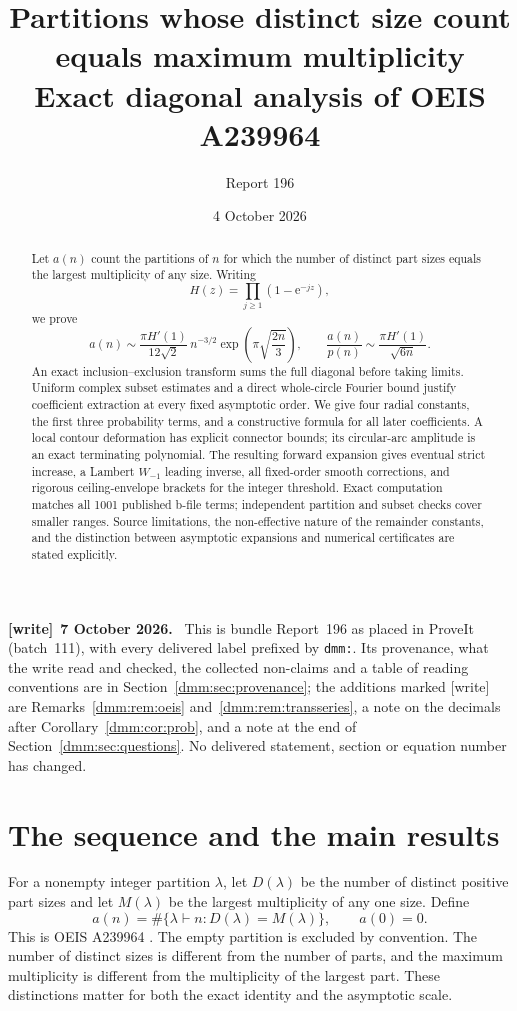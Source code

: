 \documentclass[11pt,letterpaper]{article}
\title{\LARGE\bfseries Partitions whose distinct size count\\equals maximum multiplicity\\[8pt]\large Exact diagonal analysis of OEIS A239964}
\author{Report 196}
\date{4 October 2026}
\numberwithin{equation}{section}
\theoremstyle{definition}\newtheorem{definition}[theorem]{Definition}
\theoremstyle{remark}\newtheorem{remark}[theorem]{Remark}
\newcommand{\ee}{\mathrm e}
\newcommand{\file}[1]{\nolinkurl{#1}}
\newenvironment{writenote}[1][]{\par\smallskip\begingroup\small
 \noindent\textbf{[write]}\if\relax\detokenize{#1}\relax\else~\textbf{#1.}\fi\ }%
 {\par\endgroup\smallskip}
\begin{document}
\maketitle
\begin{abstract}
Let $a(n)$ count the partitions of $n$ for which the number of distinct part sizes equals the largest multiplicity of any size. Writing
\[
H(z)=\prod_{j\ge1}(1-\ee^{-jz}),
\]
we prove
\[
a(n)\sim\frac{\pi H'(1)}{12\sqrt2}\,n^{-3/2}
\exp\!\left(\pi\sqrt{\frac{2n}{3}}\right),
\qquad
\frac{a(n)}{p(n)}\sim\frac{\pi H'(1)}{\sqrt{6n}}.
\]
An exact inclusion--exclusion transform sums the full diagonal before taking limits. Uniform complex subset estimates and a direct whole-circle Fourier bound justify coefficient extraction at every fixed asymptotic order. We give four radial constants, the first three probability terms, and a constructive formula for all later coefficients. A local contour deformation has explicit connector bounds; its circular-arc amplitude is an exact terminating polynomial. The resulting forward expansion gives eventual strict increase, a Lambert $W_{-1}$ leading inverse, all fixed-order smooth corrections, and rigorous ceiling-envelope brackets for the integer threshold. Exact computation matches all 1001 published b-file terms; independent partition and subset checks cover smaller ranges. Source limitations, the non-effective nature of the remainder constants, and the distinction between asymptotic expansions and numerical certificates are stated explicitly.
\end{abstract}
\begin{writenote}[7 October 2026]
This is bundle Report~196 as placed in ProveIt (batch~111), with every
delivered label prefixed by \file{dmm:}. Its provenance, what the write read
and checked, the collected non-claims and a table of reading conventions are
in Section~\ref{dmm:sec:provenance}; the additions marked [write] are
Remarks~\ref{dmm:rem:oeis} and~\ref{dmm:rem:transseries}, a note on the
decimals after Corollary~\ref{dmm:cor:prob}, and a note at the end of
Section~\ref{dmm:sec:questions}. No delivered statement, section or equation
number has changed.
\end{writenote}
\clearpage
{\setcounter{tocdepth}{1}\small\tableofcontents}
\newpage

\section{The sequence and the main results}\label{dmm:sec:results}
For a nonempty integer partition $\lambda$, let $D(\lambda)$ be the number of distinct positive part sizes and let $M(\lambda)$ be the largest multiplicity of any one size. Define
\begin{equation}\label{dmm:eq:def}
a(n)=\#\{\lambda\vdash n:D(\lambda)=M(\lambda)\},\qquad a(0)=0.
\end{equation}
This is OEIS A239964 \cite{oeis}. The empty partition is excluded by convention. The number of distinct sizes is different from the number of parts, and the maximum multiplicity is different from the multiplicity of the largest part. These distinctions matter for both the exact identity and the asymptotic scale.
\end{document}
